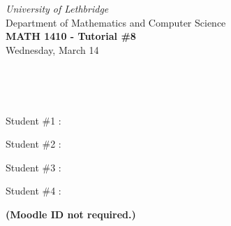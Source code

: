 \documentclass[12pt]{article}
\newcommand{\skipline}{\vspace{12pt}}
\begin{document}
\author{Instructor: Sean Fitzpatrick}
\thispagestyle{empty}
\begin{center}
\emph{University of Lethbridge}\\
Department of Mathematics and Computer Science\\
{\bf MATH 1410 - Tutorial \#8}\\
Wednesday, March 14
\end{center}
\skipline \ \noindent \skipline

\skipline \ \noindent \skipline

Student \#1 :\underline{\hspace{348pt}}\\

\bigskip

\bigskip

Student \#2 :\underline{\hspace{348pt}}\\

\bigskip

\bigskip

Student \#3 :\underline{\hspace{348pt}}\\

\bigskip

\bigskip

Student \#4 :\underline{\hspace{348pt}}\\





\bigskip

\textbf{(Moodle ID not required.)}









\newpage
\end{document}
